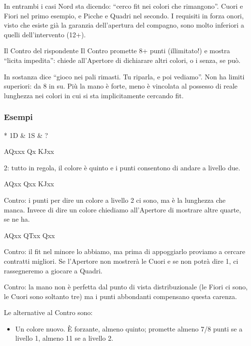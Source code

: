 \documentclass[../corsofiori.tex]{subfiles}
\begin{document}
In entrambi i casi Nord sta dicendo: “cerco fit nei colori che rimangono”.
Cuori e Fiori nel primo esempio, e Picche e Quadri nel secondo. I requisiti in forza
onori, visto che esiste già la garanzia dell’apertura del compagno, sono molto
inferiori a quelli dell’intervento (12+).

\begin{regola}{Il Contro del rispondente}
Il Contro promette 8+ punti (illimitato!)
e mostra “licita impedita”: chiede all’Apertore
di dichiarare altri colori, o i senza, se può.
\end{regola}

In sostanza dice “gioco nei pali rimasti. Tu riparla, e poi vediamo”. Non ha limiti
superiori: da 8 in su. Più la mano è forte, meno è vincolata al possesso di reale
lunghezza nei colori in cui si sta implicitamente cercando fit.

\subsubsection{Esempi}
\begin{bidding}*
    1D & 1S & ?\\
\end{bidding}

 {AQxxx}  {Qx}  {KJxx}

2\He: tutto in regola, il colore è quinto e i punti consentono di andare a livello due.
\smallskip

  {AQxx}  {Qxx}  {KJxx}

Contro: i punti per dire un colore a livello 2 ci sono, ma è la lunghezza che manca.  Invece di dire un colore chiediamo
all’Apertore di mostrare altre quarte, se ne ha.
\smallskip

  {AQxx}  {QTxx}  {Qxx}

Contro: il fit nel minore lo abbiamo, ma prima di appoggiarlo proviamo a cercare contratti migliori. Se l’Apertore non
mostrerà le Cuori e se non potrà dire 1\SA, ci
rassegneremo a giocare a Quadri.


Contro: la mano non è perfetta dal punto di vista distribuzionale (le Fiori ci sono, le
Cuori sono soltanto tre) ma i punti abbondanti compensano questa carenza.

Le alternative al Contro sono:
\begin{itemize}
\item Un colore nuovo. \`E forzante, almeno quinto; promette almeno 7/8 punti se a livello
1, almeno 11 se a livello 2.
\end{itemize}
\end{document}
